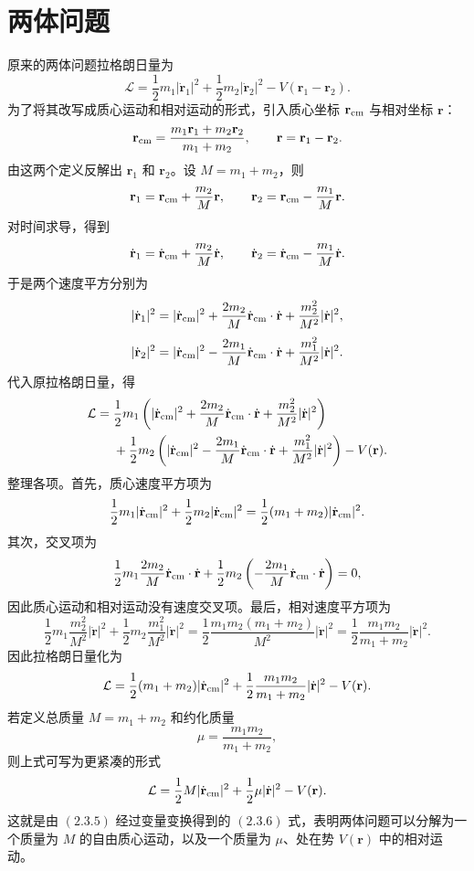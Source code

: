 ﻿%
\section{两体问题}

\begin{solution}[变换到质心系]
\answer
原来的两体问题拉格朗日量为
\[
\mathcal{L}
=\frac{1}{2}m_1|\dot{\mathbf r}_1|^2+\frac{1}{2}m_2|\dot{\mathbf r}_2|^2
-V(\mathbf r_1-\mathbf r_2).
\]
为了将其改写成质心运动和相对运动的形式，引入质心坐标 \(\mathbf r_{\rm cm}\) 与相对坐标 \(\mathbf r\)：
\[
\mathbf r_{\rm cm}=\frac{m_1\mathbf r_1+m_2\mathbf r_2}{m_1+m_2},\qquad
\mathbf r=\mathbf r_1-\mathbf r_2.
\]
由这两个定义反解出 \(\mathbf r_1\) 和 \(\mathbf r_2\)。设 \(M=m_1+m_2\)，则
\[
\mathbf r_1=\mathbf r_{\rm cm}+\frac{m_2}{M}\mathbf r,\qquad
\mathbf r_2=\mathbf r_{\rm cm}-\frac{m_1}{M}\mathbf r.
\]
对时间求导，得到
\[
\dot{\mathbf r}_1=\dot{\mathbf r}_{\rm cm}+\frac{m_2}{M}\dot{\mathbf r},\qquad
\dot{\mathbf r}_2=\dot{\mathbf r}_{\rm cm}-\frac{m_1}{M}\dot{\mathbf r}.
\]
于是两个速度平方分别为
\[
|\dot{\mathbf r}_1|^2
=
|\dot{\mathbf r}_{\rm cm}|^2
+\frac{2m_2}{M}\dot{\mathbf r}_{\rm cm}\cdot\dot{\mathbf r}
+\frac{m_2^2}{M^2}|\dot{\mathbf r}|^2,
\]
\[
|\dot{\mathbf r}_2|^2
=
|\dot{\mathbf r}_{\rm cm}|^2
-\frac{2m_1}{M}\dot{\mathbf r}_{\rm cm}\cdot\dot{\mathbf r}
+\frac{m_1^2}{M^2}|\dot{\mathbf r}|^2.
\]
代入原拉格朗日量，得
\[
\begin{aligned}
\mathcal{L}
={}&\frac{1}{2}m_1\left(
|\dot{\mathbf r}_{\rm cm}|^2
+\frac{2m_2}{M}\dot{\mathbf r}_{\rm cm}\cdot\dot{\mathbf r}
+\frac{m_2^2}{M^2}|\dot{\mathbf r}|^2
\right)\\
&+\frac{1}{2}m_2\left(
|\dot{\mathbf r}_{\rm cm}|^2
-\frac{2m_1}{M}\dot{\mathbf r}_{\rm cm}\cdot\dot{\mathbf r}
+\frac{m_1^2}{M^2}|\dot{\mathbf r}|^2
\right)-V(\mathbf r).
\end{aligned}
\]
整理各项。首先，质心速度平方项为
\[
\frac{1}{2}m_1|\dot{\mathbf r}_{\rm cm}|^2+\frac{1}{2}m_2|\dot{\mathbf r}_{\rm cm}|^2
=\frac{1}{2}(m_1+m_2)|\dot{\mathbf r}_{\rm cm}|^2.
\]
其次，交叉项为
\[
\frac{1}{2}m_1\frac{2m_2}{M}\dot{\mathbf r}_{\rm cm}\cdot\dot{\mathbf r}
+\frac{1}{2}m_2\left(-\frac{2m_1}{M}\dot{\mathbf r}_{\rm cm}\cdot\dot{\mathbf r}\right)
=0,
\]
因此质心运动和相对运动没有速度交叉项。最后，相对速度平方项为
\[
\frac{1}{2}m_1\frac{m_2^2}{M^2}|\dot{\mathbf r}|^2
+\frac{1}{2}m_2\frac{m_1^2}{M^2}|\dot{\mathbf r}|^2
=\frac{1}{2}\frac{m_1m_2(m_1+m_2)}{M^2}|\dot{\mathbf r}|^2
=\frac{1}{2}\frac{m_1m_2}{m_1+m_2}|\dot{\mathbf r}|^2.
\]
因此拉格朗日量化为
\[
\mathcal{L}
=
\frac{1}{2}(m_1+m_2)|\dot{\mathbf r}_{\rm cm}|^2
+\frac{1}{2}\frac{m_1m_2}{m_1+m_2}|\dot{\mathbf r}|^2
-V(\mathbf r).
\]
若定义总质量 \(M=m_1+m_2\) 和约化质量
\[
\mu=\frac{m_1m_2}{m_1+m_2},
\]
则上式可写为更紧凑的形式
\[
\mathcal{L}
=
\frac{1}{2}M|\dot{\mathbf r}_{\rm cm}|^2
+\frac{1}{2}\mu|\dot{\mathbf r}|^2
-V(\mathbf r).
\]
这就是由 \((2.3.5)\) 经过变量变换得到的 \((2.3.6)\) 式，表明两体问题可以分解为一个质量为 \(M\) 的自由质心运动，以及一个质量为 \(\mu\)、处在势 \(V(\mathbf r)\) 中的相对运动。
\end{solution}

